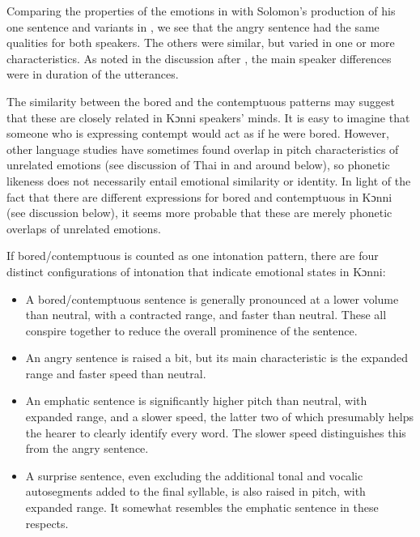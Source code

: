 \documentclass[output=paper]{langsci/langscibook}
\begin{document}
Comparing the properties of the emotions in  with Solomon's production of his one sentence and variants in , we see that the angry sentence had the same qualities for both speakers. The others were similar, but varied in one or more characteristics. As noted in the discussion after , the main speaker differences were in duration of the utterances.

The similarity between the bored and the contemptuous patterns may suggest that these are closely related in Kɔnni speakers' minds. It is easy to imagine that someone who is expressing contempt would act as if he were bored. However, other language studies have sometimes found overlap in pitch characteristics of unrelated emotions (see discussion of Thai in and around  below), so phonetic likeness does not necessarily entail emotional similarity or identity. In light of the fact that there are different expressions for bored and contemptuous in Kɔnni (see discussion below), it seems more probable that these are merely phonetic overlaps of unrelated emotions.

If bored/contemptuous is counted as one intonation pattern, there are four distinct configurations of intonation that indicate emotional states in Kɔnni:

\begin{itemize}
\item A bored/contemptuous sentence is generally pronounced at a lower volume than neutral, with a contracted range, and faster than neutral. These all conspire together to reduce the overall prominence of the sentence.
\item An angry sentence is raised a bit, but its main characteristic is the expanded range and faster speed than neutral.
\item An emphatic sentence is significantly higher pitch than neutral, with expanded range, and a slower speed, the latter two of which presumably helps the hearer to clearly identify every word. The slower speed distinguishes this from the angry sentence.
\item A surprise sentence, even excluding the additional tonal and vocalic autosegments added to the final syllable, is also raised in pitch, with expanded range. It somewhat resembles the emphatic sentence in these respects. 
\end{itemize}
\end{document}
